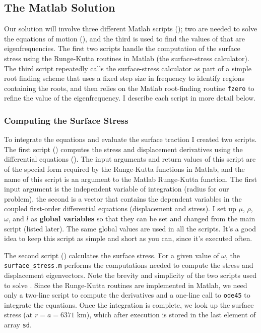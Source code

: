\documentclass[11pt,titlepage,fleqn]{article}
\begin{document}

\subsection*{The Matlab Solution}

Our solution will involve three different Matlab scripts (); two are needed to solve the equations of motion (), and the third is used to find the values of that are eigenfrequencies. The first two scripts handle the computation of the surface stress using the Runge-Kutta routines in Matlab (the surface-stress calculator). The third script repeatedly calls the surface-stress calculator as part of a simple root finding scheme that uses a fixed step size in frequency to identify regions containing the roots, and then relies on the Matlab root-finding routine \verb+fzero+ to refine the value of the eigenfrequency. I describe each script in more detail below.

\subsubsection*{Computing the Surface Stress}

To integrate the equations and evaluate the surface traction I created two scripts. The first script () computes the stress and displacement derivatives using the differential equations (). The input arguments and return values of this script are of the special form required by the Runge-Kutta functions in Matlab, and the name of this script is an argument to the Matlab Runge-Kutta function. The first input argument is the independent variable of integration (radius for our problem), the second is a vector that contains the dependent variables in the coupled first-order differential equations (displacement and stress). I set up $\mu$, $\rho$, $\omega$, and $l$ as {\bf global variables} so that they can be set and changed from the main script (listed later). The same global values are used in all the scripts. It's a good idea to keep this script as simple and short as you can, since it's executed often.

The second script () calculates the surface stress. For a given value of $\omega$, the \verb+surface_stress.m+ performs the computations needed to compute the stress and displacement eigenvectors. Note the brevity and simplicity of the two scripts used to solve . Since the Runge-Kutta routines are implemented in Matlab, we need only a two-line script to compute the derivatives and a one-line call to \verb+ode45+ to integrate the equations. Once the integration is complete, we look up the surface stress (at $r = a = 6371$ km), which after execution is stored in the last element of array \verb+sd+.
\end{document}
